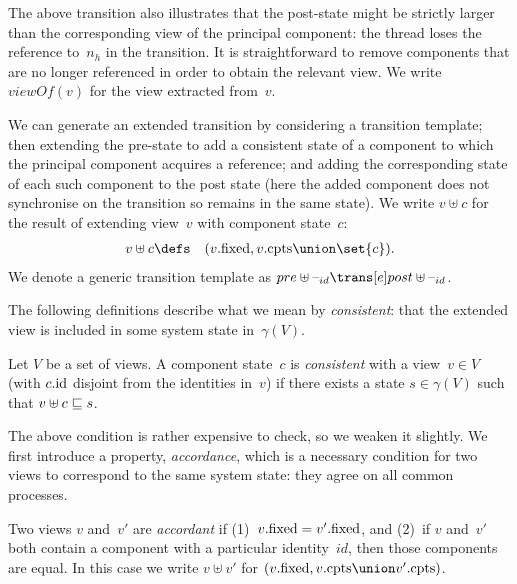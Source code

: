 The above transition also illustrates that the post-state might be strictly
larger than the corresponding view of the principal component: the thread
loses the reference to~$n_h$ in the transition.  It is straightforward to
remove components that are no longer referenced in order to obtain the
relevant view.  We write $viewOf(v)$ for the view extracted from~$v$. 

We can generate an extended transition by considering a transition template;
then extending the pre-state to add a consistent state of a component to which
the principal component acquires a reference; and adding the corresponding
state of each such component to the post state (here the added component does
not synchronise on the transition so remains in the same state).  We write $v
\uplus c$ for the result of extending view~$v$ with component state~$c$:
\begin{eqnarray*}
v \uplus c & \defs & (v.\fixed, v.\cpts \union \set{c}).
\end{eqnarray*}
%
We denote a generic transition template as $pre \uplus \hole{id} \trans[e]
post \uplus \hole{id}$. 


The following definitions describe what we mean by \emph{consistent}: that the
extended view is included in some system state in~$\gamma(V)$.
%
\begin{definition}
Let $V$ be a set of views.  A component state~$c$ is \emph{consistent} with a
view~$v \in V$ (with $c.\mathrm{id}$ disjoint from the identities in~$v$) if there
exists a state $s \in \gamma(V)$ such that $v \uplus c \sqsubseteq s$.
\end{definition}
%
The above condition is rather expensive to check, so we weaken it slightly.
We first introduce a property, \emph{accordance}, which is a necessary
condition for two views to correspond to the same system state: they agree on
all common processes.
%
\begin{definition}
Two views $v$ and~$v'$ are \emph{accordant} if (1)~$v.\mathrm{fixed} = v'.\mathrm{fixed}$, and
(2)~if $v$ and~$v'$ both contain a component with a particular identity~$id$,
then those components are equal.  In this case we write $v \uplus v'$ for
$(v.\fixed, v.\cpts \union v'.\cpts)$.  
\end{definition}


